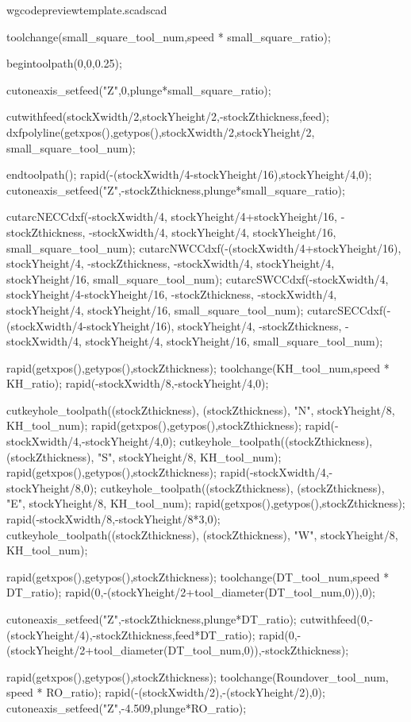 \documentclass{ltxdoc}
\begin{document}
\begin{writecode}{w}{gcodepreviewtemplate.scad}{scad}
{toolchange(small_square_tool_num,speed * small_square_ratio);

begintoolpath(0,0,0.25);

cutoneaxis_setfeed("Z",0,plunge*small_square_ratio);

cutwithfeed(stockXwidth/2,stockYheight/2,-stockZthickness,feed);
dxfpolyline(getxpos(),getypos(),stockXwidth/2,stockYheight/2, small_square_tool_num);

endtoolpath();
rapid(-(stockXwidth/4-stockYheight/16),stockYheight/4,0);
cutoneaxis_setfeed("Z",-stockZthickness,plunge*small_square_ratio);

cutarcNECCdxf(-stockXwidth/4, stockYheight/4+stockYheight/16, -stockZthickness, -stockXwidth/4, stockYheight/4, stockYheight/16, small_square_tool_num);
cutarcNWCCdxf(-(stockXwidth/4+stockYheight/16), stockYheight/4, -stockZthickness, -stockXwidth/4, stockYheight/4, stockYheight/16, small_square_tool_num);
cutarcSWCCdxf(-stockXwidth/4, stockYheight/4-stockYheight/16, -stockZthickness, -stockXwidth/4, stockYheight/4, stockYheight/16, small_square_tool_num);
cutarcSECCdxf(-(stockXwidth/4-stockYheight/16), stockYheight/4, -stockZthickness, -stockXwidth/4, stockYheight/4, stockYheight/16, small_square_tool_num);

rapid(getxpos(),getypos(),stockZthickness);
toolchange(KH_tool_num,speed * KH_ratio);
rapid(-stockXwidth/8,-stockYheight/4,0);

cutkeyhole_toolpath((stockZthickness), (stockZthickness), "N", stockYheight/8, KH_tool_num);
rapid(getxpos(),getypos(),stockZthickness);
rapid(-stockXwidth/4,-stockYheight/4,0);
cutkeyhole_toolpath((stockZthickness), (stockZthickness), "S", stockYheight/8, KH_tool_num);
rapid(getxpos(),getypos(),stockZthickness);
rapid(-stockXwidth/4,-stockYheight/8,0);
cutkeyhole_toolpath((stockZthickness), (stockZthickness), "E", stockYheight/8, KH_tool_num);
rapid(getxpos(),getypos(),stockZthickness);
rapid(-stockXwidth/8,-stockYheight/8*3,0);
cutkeyhole_toolpath((stockZthickness), (stockZthickness), "W", stockYheight/8, KH_tool_num);

rapid(getxpos(),getypos(),stockZthickness);
toolchange(DT_tool_num,speed * DT_ratio);
rapid(0,-(stockYheight/2+tool_diameter(DT_tool_num,0)),0);

cutoneaxis_setfeed("Z",-stockZthickness,plunge*DT_ratio);
cutwithfeed(0,-(stockYheight/4),-stockZthickness,feed*DT_ratio);
rapid(0,-(stockYheight/2+tool_diameter(DT_tool_num,0)),-stockZthickness);

rapid(getxpos(),getypos(),stockZthickness);
toolchange(Roundover_tool_num, speed * RO_ratio);
rapid(-(stockXwidth/2),-(stockYheight/2),0);
cutoneaxis_setfeed("Z",-4.509,plunge*RO_ratio);

}
\end{writecode}
\end{document}
